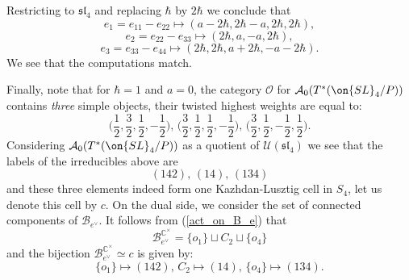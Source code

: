 \documentclass[12pt]{amsart}
\begin{document}
Restricting to $\mathfrak{sl}_4$ and replacing $\hbar$ by $2\hbar$ we conclude that 
\begin{equation*}
e_1=e_{11}-e_{22} \mapsto (a-2\hbar,2\hbar-a,2\hbar,2\hbar),
\end{equation*}
\begin{equation*}
e_2=e_{22}-e_{33} \mapsto (2\hbar,a,-a,2\hbar),   
\end{equation*}
\begin{equation*}
e_3=e_{33}-e_{44} \mapsto (2\hbar,2\hbar,a+2\hbar,-a-2\hbar).
\end{equation*}
We see that the computations match. 




Finally, note that for $\hbar=1$ and $a=0$, the category $\mathcal{O}$ for $\mathcal{A}_0(T^*(\on{SL}_4/P))$ contains {\emph{three}} simple objects, their twisted highest weights are equal to:
\begin{equation*}
\Big(\frac{1}{2},\frac{3}{2},\frac{1}{2},-\frac{1}{2}\Big),\,\Big(\frac{3}{2},\frac{1}{2},\frac{1}{2},-\frac{1}{2}\Big),\, \Big(\frac{3}{2},\frac{1}{2},-\frac{1}{2},\frac{1}{2}\Big).
\end{equation*}
Considering $\mathcal{A}_0(T^*(\on{SL}_4/P))$ as a quotient of $\mathcal{U}(\mathfrak{sl}_4)$ we see that the labels of the irreducibles above are 
\begin{equation*}
(142),\, (14),\, (134)
\end{equation*}
and these three elements indeed form one 
Kazhdan-Lusztig cell in $S_4$, let us denote this cell by $c$. On the dual side, we consider the set of connected components of $\mathcal{B}_{e^\vee}$. It follows from (\ref{act_on_B_e}) that 
\begin{equation*}
\mathcal{B}_{e^\vee}^{\mathbb{C}^\times} = \{o_1\} \sqcup C_2 \sqcup \{o_4\}
\end{equation*}
and the bijection $\mathcal{B}_{e^\vee}^{\mathbb{C}^\times} \simeq c$ is given by:
\begin{equation*}
\{o_1\}  \mapsto (142),\, C_2 \mapsto (14),\, \{o_4\} \mapsto (134).
\end{equation*}
\end{document}
